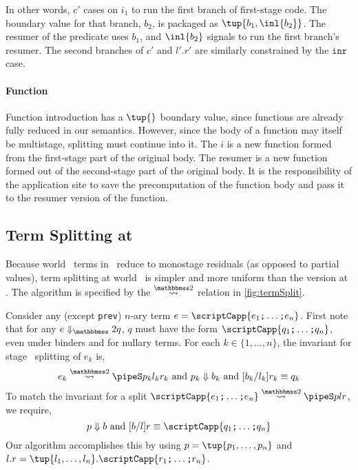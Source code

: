 \begin{abstrsyn}
In other words, $c'$ cases on $i_1$ to run the first branch of first-stage
code. The boundary value for that branch, $b_2$, is packaged as $\tup {b_1, \inl
{b_2}}$. The resumer of the predicate uses $b_1$, and $\inl{b_2}$ signals to run
the first branch's resumer. The second branches of $c'$ and $l'.r'$ are
similarly constrained by the $\texttt{inr}$ case.


\paragraph {Function} 
Function introduction has a $\tup{}$ boundary value,
since functions are already fully reduced in our semantics.
However, since the body of a function may itself be multistage, splitting must continue into it.
The $i$ is a new function formed from the first-stage part of the original body.
The resumer is a new function formed out of the second-stage part of the original body.
It is the responsibility of the application site to save the precomputation of the function body
and pass it to the resumer version of the function.

\subsection{Term Splitting at \bbtwo}

Because world \bbtwo\ terms in \lang\ reduce to monostage residuals (as opposed to partial values),
term splitting at world \bbtwo\ is simpler and more uniform than the version at \bbonem. 
The algorithm is specified by the $\splittwosym$ relation in \cref{fig:termSplit}.

Consider any (except \texttt{prev}) 
$n$-ary term $e = \scriptCapp {e_1 \ttsemi \ldots \ttsemi e_n}$.
First note that for any $\diatwo e q$, $q$ must have the form $\scriptCapp {q_1 \ttsemi \ldots \ttsemi q_n}$,
even under binders and for nullary terms.
For each $k \in \{1,\ldots,n\}$, the invariant for stage \bbtwo\ splitting of $e_k$ is,
\[
	\splittwo {e_k} A {p_k} {l_k} {r_k} \text{ and } \reduce {p_k} {b_k} \text{ and } [{b_k}/{l_k}]{r_k} \equiv {q_k}
\]
To match the invariant for a split $\splittwo {\scriptCapp {e_1 \ttsemi \ldots \ttsemi e_n}} A p l r$, we require,
\[
	\reduce p b \text{ and } [b/l]r \equiv \scriptCapp {q_1 \ttsemi \ldots \ttsemi q_n}
\]
Our algorithm accomplishes this by using $p = \tup {p_1, \ldots, p_n}$ and
$l.r = \tup {l_1, \ldots, l_n}.\scriptCapp {r_1 \ttsemi \ldots \ttsemi r_n}$.


\end{abstrsyn}
